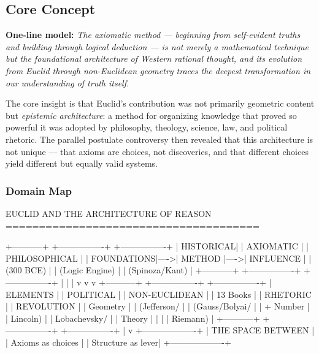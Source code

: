 \documentclass[11pt,letterpaper]{article}
\begin{document}
\subsection{Core Concept}

\textbf{One-line model:} \textit{The axiomatic method --- beginning from self-evident truths and building through logical deduction --- is not merely a mathematical technique but the foundational architecture of Western rational thought, and its evolution from Euclid through non-Euclidean geometry traces the deepest transformation in our understanding of truth itself.}

The core insight is that Euclid's contribution was not primarily geometric content but \textit{epistemic architecture}: a method for organizing knowledge that proved so powerful it was adopted by philosophy, theology, science, law, and political rhetoric. The parallel postulate controversy then revealed that this architecture is not unique --- that axioms are choices, not discoveries, and that different choices yield different but equally valid systems.

\subsubsection{Domain Map}

\begin{asciibox}
                    EUCLID AND THE ARCHITECTURE OF REASON
                    ======================================

    +-----------+     +----------------+     +----------------+
    | HISTORICAL|     |   AXIOMATIC    |     | PHILOSOPHICAL  |
    | FOUNDATIONS|---->|    METHOD      |---->|   INFLUENCE    |
    | (300 BCE) |     | (Logic Engine) |     | (Spinoza/Kant) |
    +-----------+     +----------------+     +----------------+
          |                   |                      |
          v                   v                      v
    +-----------+     +----------------+     +----------------+
    |  ELEMENTS |     |   POLITICAL    |     |  NON-EUCLIDEAN |
    | 13 Books  |     |   RHETORIC     |     |  REVOLUTION    |
    | Geometry  |     | (Jefferson/    |     | (Gauss/Bolyai/ |
    | + Number  |     |  Lincoln)      |     |  Lobachevsky/  |
    | Theory    |     |                |     |  Riemann)      |
    +-----------+     +----------------+     +----------------+
                              |
                              v
                    +-------------------+
                    | THE SPACE BETWEEN |
                    | Axioms as choices |
                    | Structure as lever|
                    +-------------------+
\end{asciibox}
\end{document}
